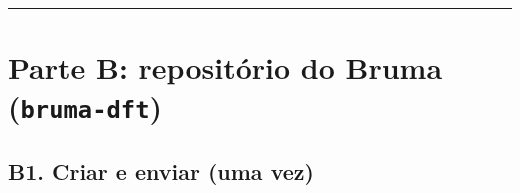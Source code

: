 \documentclass[
  10pt,
]{article}
\begin{document}
\begin{center}\rule{0.5\linewidth}{0.5pt}\end{center}

\hypertarget{parte-b-reposituxf3rio-do-bruma-bruma-dft}{%
\section{\texorpdfstring{Parte B: repositório do Bruma
(\texttt{bruma-\allowbreak{}dft})}{Parte B: repositório do Bruma ()}}\label{parte-b-reposituxf3rio-do-bruma-bruma-dft}}

\hypertarget{b1.-criar-e-enviar-uma-vez}{%
\subsection{B1. Criar e enviar (uma
vez)}\label{b1.-criar-e-enviar-uma-vez}}
\end{document}
